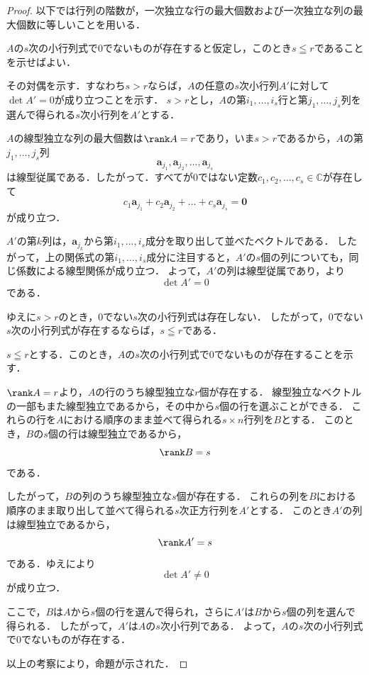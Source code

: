 \begin{tleftbar}
\begin{proof}
  以下では行列の階数が，一次独立な行の最大個数および一次独立な列の最大個数に等しいことを用いる．


  $A$の$s$次の小行列式で$0$でないものが存在すると仮定し，このとき$s \leqq r$であることを示せばよい．

  その対偶を示す．すなわち$s > r$ならば，$A$の任意の$s$次小行列$A'$に対して$\det A' = 0$が成り立つことを示す．
  $s > r$とし，$A$の第$i_1,\dots,i_s$行と第$j_1,\dots,j_s$列を選んで得られる$s$次小行列を$A'$とする．

  $A$の線型独立な列の最大個数は$\rank A = r$であり，いま$s > r$であるから，$A$の第$j_1,\dots,j_s$列
  \[
  \bm{a}_{j_1},\bm{a}_{j_2},\dots,\bm{a}_{j_s}
  \]
  は線型従属である．したがって．すべてが$0$ではない定数$c_1,c_2,\dots,c_s \in \mathbb{C}$が存在して
  \[
  c_1 \bm{a}_{j_1} + c_2 \bm{a}_{j_2} + \dots + c_s \bm{a}_{j_s} = \bm{0}
  \]
  が成り立つ．

  $A'$の第$k$列は，$\bm{a}_{j_k}$から第$i_1,\dots,i_s$成分を取り出して並べたベクトルである．
  したがって，上の関係式の第$i_1,\dots,i_s$成分に注目すると，$A'$の$s$個の列についても，同じ係数による線型関係が成り立つ．
  よって，$A'$の列は線型従属であり，より
  \[
  \det A' = 0
  \]
  である．

  ゆえに$s > r$のとき，$0$でない$s$次の小行列式は存在しない．
  したがって，$0$でない$s$次の小行列式が存在するならば，$s \leqq r$である．


  $s \leqq r$とする．このとき，$A$の$s$次の小行列式で$0$でないものが存在することを示す．

  $\rank A = r$より，$A$の行のうち線型独立な$r$個が存在する．
  線型独立なベクトルの一部もまた線型独立であるから，その中から$s$個の行を選ぶことができる．
  これらの行を$A$における順序のまま並べて得られる$s \times n$行列を$B$とする．
  このとき，$B$の$s$個の行は線型独立であるから，
  \[
  \rank B = s
  \]
  である．

  したがって，$B$の列のうち線型独立な$s$個が存在する．
  これらの列を$B$における順序のまま取り出して並べて得られる$s$次正方行列を$A'$とする．
  このとき$A'$の列は線型独立であるから，
  \[
  \rank A' = s
  \]
  である．ゆえにより
  \[
  \det A' \ne 0
  \]
  が成り立つ．

  ここで，$B$は$A$から$s$個の行を選んで得られ，さらに$A'$は$B$から$s$個の列を選んで得られる．
  したがって，$A'$は$A$の$s$次小行列である．
  よって，$A$の$s$次の小行列式で$0$でないものが存在する．

  以上の考察により，命題が示された．
\end{proof}
\end{tleftbar}

